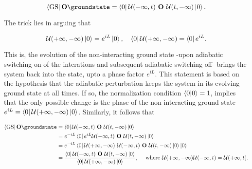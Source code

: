 $$
    \bra{\textnormal{GS}} {{\bf O}} \groundstate = \bra{0} 
        \mathcal{U}(-\infty, t) \blanky {{\bf O}} \blanky \mathcal{U}(t, -\infty)
    \ket{0}.
$$

The trick lies in arguing that 

$$
    \mathcal{U}(+\infty, - \infty) \ket{0} = e^{iL} \ket{0}, \quad \bra{0} \mathcal{U}(+\infty, - \infty) = \bra{0} e^{iL}.
$$

This is, the evolution of the non-interacting ground state -upon adiabatic switching-on of the interations and subsequent adiabatic switching-off- brings the system back into the state, upto a phase factor $e^{iL}$.
This statement is based on the hypothesis that the adiabatic perturbation keeps the system in its evolving ground state at all times.
If so, the normalization condition $\bra{0}\ket{0} = 1$, implies that the only possible change is the phase of the non-interacting ground state $e^{iL} = \bra{0} \mathcal{U}(+\infty, -\infty) \ket{0}$. 
Similarly, it follows that 

\begin{equation}
\label{Intro_QFT_Observable_ex_v}
    \begin{split}
        \bra{\textnormal{GS}} {\bf O} \groundstate &= \bra{0} \mathcal{U}(-\infty, t) \blanky {\bf O} \blanky \mathcal{U}(t, - \infty) \ket{0} \\
        &= e^{-iL} \bra{0} 
                     e^{iL} \mathcal{U}(-\infty, t) \blanky {\bf O} \blanky \mathcal{U}(t, - \infty) \ket{0} \\
        &= e^{-iL} \bra{0}
            \mathcal{U}(+\infty, -\infty) \blanky \mathcal{U}(-\infty, t) \blanky {\bf O} \blanky \mathcal{U}(t, -\infty) \ket{0} 
        \ket{0}\\
        &= \frac{\bra{0}
            \mathcal{U}(+\infty,t) \blanky {\bf O} \blanky \mathcal{U}(t, - \infty)
        \ket{0}
        }{\bra{0} \mathcal{U}(+\infty, -\infty) \ket{0}}, \quad \textnormal{ where } \mathcal{U}(+\infty, - \infty) \mathcal{U}(-\infty, t) = \mathcal{U}(+\infty, t). 
    \end{split}
\end{equation}

